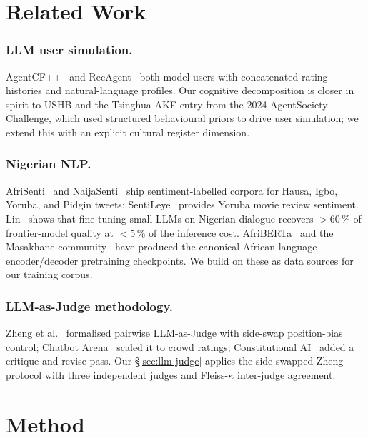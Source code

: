 \documentclass[sigconf,nonacm,balance]{acmart}
\begin{document}
\section{Related Work}

\subsubsection*{LLM user simulation.} AgentCF++~\cite{agentcf} and
RecAgent~\cite{recagent} both model users with concatenated rating histories
and natural-language profiles. Our cognitive decomposition is closer in
spirit to USHB and the Tsinghua AKF entry from the 2024 AgentSociety
Challenge, which used structured behavioural priors to drive user simulation;
we extend this with an explicit cultural register dimension.

\subsubsection*{Nigerian NLP.}  AfriSenti~\cite{afrisenti} and
NaijaSenti~\cite{naijasenti} ship sentiment-labelled corpora for Hausa,
Igbo, Yoruba, and Pidgin tweets; SentiLeye~\cite{sentileye} provides Yoruba
movie review sentiment.  Lin~\cite{lin2024} shows that fine-tuning small
LLMs on Nigerian dialogue recovers $>$60\,\% of frontier-model quality at
$<$5\,\% of the inference cost. AfriBERTa~\cite{afriberta} and the
Masakhane community~\cite{masakhane} have produced the canonical
African-language encoder/decoder pretraining checkpoints. We build on
these as data sources for our training corpus.

\subsubsection*{LLM-as-Judge methodology.} Zheng et al.~\cite{mtbench}
formalised pairwise LLM-as-Judge with side-swap position-bias control;
Chatbot Arena~\cite{chatbotarena} scaled it to crowd ratings; Constitutional
AI~\cite{constitutionalai} added a critique-and-revise pass. Our §\ref{sec:llm-judge}
applies the side-swapped Zheng protocol with three independent judges and
Fleiss-$\kappa$ inter-judge agreement.

\section{Method}
\end{document}
